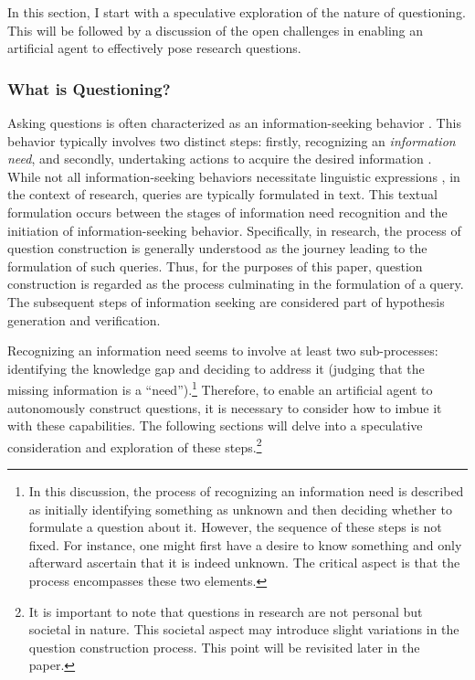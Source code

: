 \documentclass{article}
\begin{document}
In this section, I start with a speculative exploration of the nature of questioning. This will be followed by a discussion of the open challenges in enabling an artificial agent to effectively pose research questions.

\subsubsection{What is Questioning?}
Asking questions is often characterized as an information-seeking behavior \cite{watson_2021,taylor1962process}. This behavior typically involves two distinct steps: firstly, recognizing an \textit{information need}, and secondly, undertaking actions to acquire the desired information \cite{wilson1997information,case2016looking}. While not all information-seeking behaviors necessitate linguistic expressions \cite{watson_2021}, in the context of research, queries are typically formulated in text. This textual formulation occurs between the stages of information need recognition and the initiation of information-seeking behavior. Specifically, in research, the process of question construction is generally understood as the journey leading to the formulation of such queries. Thus, for the purposes of this paper, question construction is regarded as the process culminating in the formulation of a query. The subsequent steps of information seeking are considered part of hypothesis generation and verification.

Recognizing an information need seems to involve at least two sub-processes: identifying the knowledge gap and deciding to address it (judging that the missing information is a ``need'').\footnote{
In this discussion, the process of recognizing an information need is described as initially identifying something as unknown and then deciding whether to formulate a question about it. However, the sequence of these steps is not fixed. For instance, one might first have a desire to know something and only afterward ascertain that it is indeed unknown. The critical aspect is that the process encompasses these two elements.
} Therefore, to enable an artificial agent to autonomously construct questions, it is necessary to consider how to imbue it with these capabilities. The following sections will delve into a speculative consideration and exploration of these steps.\footnote{
It is important to note that questions in research are not personal but societal in nature. This societal aspect may introduce slight variations in the question construction process. This point will be revisited later in the paper.
}
\end{document}
